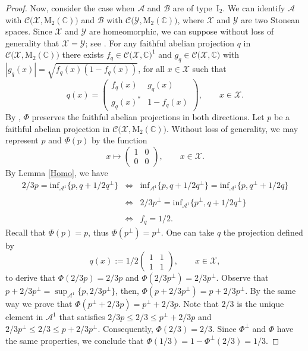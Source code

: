 \documentclass[12pt]{amsart}
\theoremstyle{definition}
\theoremstyle{remark}
\numberwithin{equation}{section}
\begin{document}
\begin{proof}
Now, consider the case when $\mathcal{A}$ and $\mathcal{B}$ are of type~$\mathrm{I}_2$.  We can identify  $\mathcal{A}$ with $\mathcal{C(X},\mathrm{M}_2(\mathbb{C}))$ and $\mathcal{B}$ with $\mathcal{C(Y},\mathrm{M}_2(\mathbb{C}))$, where $\mathcal{X}$ and $\mathcal{Y}$ are two Stonean spaces. Since $\mathcal{X}$ and $\mathcal{Y}$ are homeomorphic, we can suppose without loss of generality that $\mathcal{X}=\mathcal{Y}$; see \cite[Theorem 2.4 and  Section 5]{Our}.  For any  faithful abelian projection $q$ in $\mathcal{C(X},\mathrm{M}_2(\mathbb{C}))$ there exists  $f_q\in\mathcal{C(X},\mathbb{C})^{1}$ and $g_q\in \mathcal{C(X},\mathbb{C})$ with  $|g_q(x)|=\sqrt{f_q(x)(1-f_q(x))}$, for all $x\in\mathcal{X}$ such that $$q(x)=\begin{pmatrix}
	f_q(x) & g_q(x)\\
	g_q(x)^* & 1-f_q(x)
\end{pmatrix}, \qquad x\in\mathcal{X}.$$
By \cite[Theorem 2.4]{Our}, $\Phi$ preserves the faithful  abelian projections in both directions. Let $p$ be a faithful   abelian projection in $\mathcal{C(X},\mathrm{M}_2(\mathbb{C}))$. Without loss of generality,   we may represent  $p$ and $\Phi(p)$   by the function  $$x\mapsto \begin{pmatrix}
	1 & 	0\\
	0 & 0
\end{pmatrix}, \qquad x\in\mathcal{X}.$$  
By  Lemma \ref{Homo}, we have  $$\begin{array}{lll}
	2/3p=\mathrm{inf}_{\mathcal{A}^1}\{p,q+1/2q^\perp\}&\iff& \mathrm{inf}_{\mathcal{A}^1}\{p,q+1/2q^\perp\}=\mathrm{inf}_{\mathcal{A}^1}\{p,q^\perp+1/2q\} \\\\
	&\iff& 2/3p^\perp=\mathrm{inf}_{\mathcal{A}^1}\{p^\perp,q+1/2q^\perp\}\\\\
	&\iff& f_q=1/2.
\end{array}$$
Recall that $\Phi(p)=p$, thus $\Phi(p^{\perp})=p^{\perp}$. One can  take  $q$ the projection   defined by $$q(x):= 1/2\begin{pmatrix}
	1 &  1\\
	1 & 1
\end{pmatrix}, \qquad x\in\mathcal{X},$$  to derive that $\Phi(2/3p)=2/3p$ and $\Phi(2/3p^\perp)=2/3p^\perp$.  Observe that $p+2/3p^\perp=\sup_{\mathcal{A}^1}\{p,2/3p^\perp\}$, then, $\Phi(p+2/3p^\perp)=p+2/3p^\perp$. By the same way we prove that $\Phi(p^\perp+2/3p)=p^\perp+2/3p$. Note  that $2/3$ is the unique element in $\mathcal{A}^1$ that satisfies $2/3p\leq 2/3\leq p^\perp+2/3p$ and  $2/3p^\perp\leq 2/3\leq p+2/3p^\perp$.  Consequently, $\Phi(2/3)=2/3$. Since $\Phi^\perp$ and $\Phi$ have the same properties, we conclude that $\Phi(1/3)=1-\Phi^\perp(2/3)=1/3$.


\end{proof}
\end{document}
